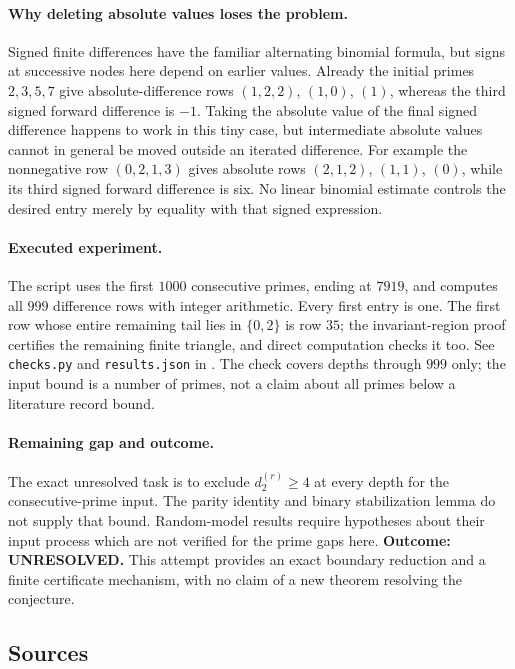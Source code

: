 \documentclass[11pt,a4paper]{article}
\begin{document}
\paragraph{Why deleting absolute values loses the problem.}
Signed finite differences have the familiar alternating binomial
formula, but signs at successive nodes here depend on earlier values.
Already the initial primes $2,3,5,7$ give absolute-difference rows
$(1,2,2)$, $(1,0)$, $(1)$, whereas the third signed forward difference
is $-1$. Taking the absolute value of the final signed difference happens
to work in this tiny case, but intermediate absolute values cannot in
general be moved outside an iterated difference. For example the
nonnegative row $(0,2,1,3)$ gives absolute rows $(2,1,2)$, $(1,1)$,
$(0)$, while its third signed forward difference is six. No linear
binomial estimate controls the desired entry merely by equality with
that signed expression.

\paragraph{Executed experiment.}
The script uses the first $1000$ consecutive primes, ending at $7919$,
and computes all $999$ difference rows with integer arithmetic. Every
first entry is one. The first row whose entire remaining tail lies in
$\{0,2\}$ is row $35$; the invariant-region proof certifies the
remaining finite triangle, and direct computation checks it too.
See \texttt{checks.py} and \texttt{results.json} in
.
The check covers depths through $999$ only; the input bound is a number
of primes, not a claim about all primes below a literature record bound.

\paragraph{Remaining gap and outcome.}
The exact unresolved task is to exclude $d_2^{(r)}\ge4$ at every depth
for the consecutive-prime input. The parity identity and binary
stabilization lemma do not supply that bound. Random-model results
require hypotheses about their input process which are not verified for
the prime gaps here. \textbf{Outcome: UNRESOLVED.} This attempt provides
an exact boundary reduction and a finite certificate mechanism, with no
claim of a new theorem resolving the conjecture.

\subsection{Sources}
\end{document}
